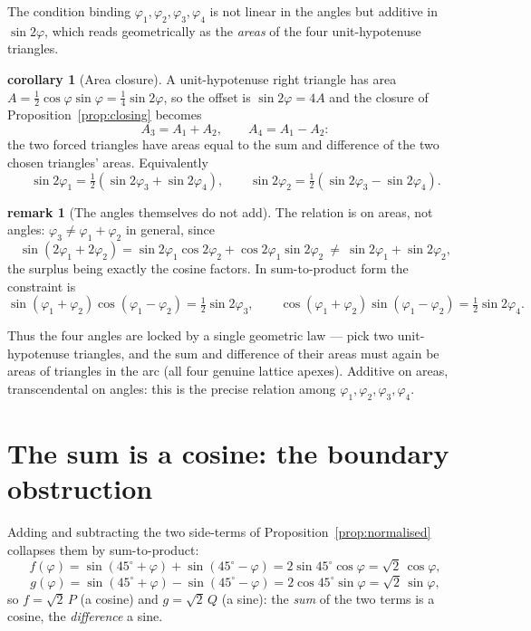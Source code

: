 \documentclass[11pt]{article}
\theoremstyle{definition}
\newtheorem{remark}{remark}
\newtheorem{corollary}{corollary}
\begin{document}
The condition binding $\varphi_1,\varphi_2,\varphi_3,\varphi_4$ is not linear in
the angles but additive in $\sin2\varphi$, which reads geometrically as the
\emph{areas} of the four unit-hypotenuse triangles.

\begin{corollary}[Area closure]\label{cor:areas}
A unit-hypotenuse right triangle has area
$A=\tfrac12\cos\varphi\sin\varphi=\tfrac14\sin2\varphi$, so the offset is
$\sin2\varphi=4A$ and the closure of Proposition~\ref{prop:closing} becomes
\[
  A_3=A_1+A_2,\qquad A_4=A_1-A_2:
\]
the two forced triangles have areas equal to the sum and difference of the two
chosen triangles' areas. Equivalently
\[
  \sin2\varphi_1=\tfrac12(\sin2\varphi_3+\sin2\varphi_4),\qquad
  \sin2\varphi_2=\tfrac12(\sin2\varphi_3-\sin2\varphi_4).
\]
\end{corollary}

\begin{remark}[The angles themselves do not add]
The relation is on areas, not angles: $\varphi_3\ne\varphi_1+\varphi_2$ in
general, since
\[
  \sin(2\varphi_1+2\varphi_2)=\sin2\varphi_1\cos2\varphi_2+\cos2\varphi_1\sin2\varphi_2
  \ \ne\ \sin2\varphi_1+\sin2\varphi_2,
\]
the surplus being exactly the cosine factors. In sum-to-product form the
constraint is
\[
  \sin(\varphi_1+\varphi_2)\cos(\varphi_1-\varphi_2)=\tfrac12\sin2\varphi_3,\qquad
  \cos(\varphi_1+\varphi_2)\sin(\varphi_1-\varphi_2)=\tfrac12\sin2\varphi_4.
\]
\end{remark}

\noindent Thus the four angles are locked by a single geometric law --- pick two
unit-hypotenuse triangles, and the sum and difference of their areas must again
be areas of triangles in the arc (all four genuine lattice apexes). Additive on
areas, transcendental on angles: this is the precise relation among
$\varphi_1,\varphi_2,\varphi_3,\varphi_4$.

\section{The sum is a cosine: the boundary obstruction}

Adding and subtracting the two side-terms of Proposition~\ref{prop:normalised}
collapses them by sum-to-product:
\[
  f(\varphi)=\sin(45^\circ+\varphi)+\sin(45^\circ-\varphi)=2\sin45^\circ\cos\varphi=\sqrt2\,\cos\varphi,
\]
\[
  g(\varphi)=\sin(45^\circ+\varphi)-\sin(45^\circ-\varphi)=2\cos45^\circ\sin\varphi=\sqrt2\,\sin\varphi,
\]
so $f=\sqrt2\,P$ (a cosine) and $g=\sqrt2\,Q$ (a sine): the \emph{sum} of the two
terms is a cosine, the \emph{difference} a sine.
\end{document}
